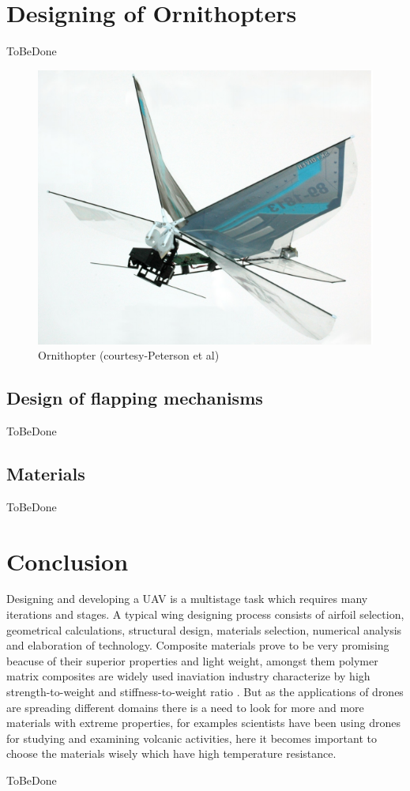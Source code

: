 \documentclass{article}
\begin{document}
\section{Designing of Ornithopters}
ToBeDone
\begin{figure}[h!]
\centering
\includegraphics[scale=0.3]{dfm1}
\caption{Ornithopter (courtesy-Peterson et al)}
\label{fig:universe}
\end{figure}

\subsection{Design of flapping mechanisms}
ToBeDone

\subsection{Materials}
ToBeDone

\section{Conclusion}
Designing and developing a UAV is a multistage task which requires many iterations and stages. A typical wing designing process consists of airfoil selection, geometrical calculations, structural design, materials selection, numerical analysis and elaboration of technology. Composite materials prove to be very promising beacuse of their superior properties and light weight, amongst them polymer matrix composites are widely used inaviation industry characterize by high strength-to-weight and stiffness-to-weight ratio \citep{Grodzki}. But as the applications of drones are spreading different domains there is a need to look for more and more materials with extreme properties, for examples scientists have been using drones for studying and examining volcanic activities, here it becomes important to choose the materials wisely which have high temperature resistance.

ToBeDone





\end{document}
